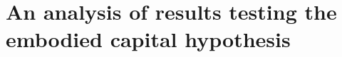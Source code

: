 \section{An analysis of results testing the embodied capital hypothesis}

\cite{bird_children_2002}

\cite{bird_constraints_2002}

\cite{blurton_jones_selection_2002}

